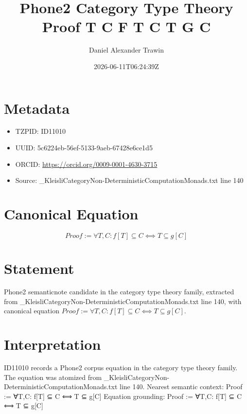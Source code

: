 \documentclass[11pt]{article}
\title{Phone2 Category Type Theory Proof T C F T C T G C}
\author{Daniel Alexander Trawin}
\date{2026-06-11T06:24:39Z}
\begin{document}
\maketitle
\section*{Metadata}
\begin{itemize}
\item TZPID: ID11010
\item UUID: 5c6224eb-56ef-5133-9aeb-67428e6ce1d5
\item ORCID: \url{https://orcid.org/0009-0001-4630-3715}
\item Source: _KleisliCategoryNon-DeterministicComputationMonads.txt line 140
\end{itemize}
\section*{Canonical Equation}
\[
Proof := ∀T,C: f[T] ⊆ C ⟺ T ⊆ g[C]
\]
\section*{Statement}
Phone2 semanticnote candidate in the category type theory family, extracted from _KleisliCategoryNon-DeterministicComputationMonads.txt line 140, with canonical equation $Proof := ∀T,C: f[T] ⊆ C ⟺ T ⊆ g[C]$.
\section*{Interpretation}
ID11010 records a Phone2 corpus equation in the category type theory family. The equation was atomized from _KleisliCategoryNon-DeterministicComputationMonads.txt line 140. Nearest semantic context: Proof := ∀T,C: f[T] ⊆ C ⟺ T ⊆ g[C] Equation grounding: Proof := ∀T,C: f[T] ⊆ C ⟺ T ⊆ g[C]
\end{document}
